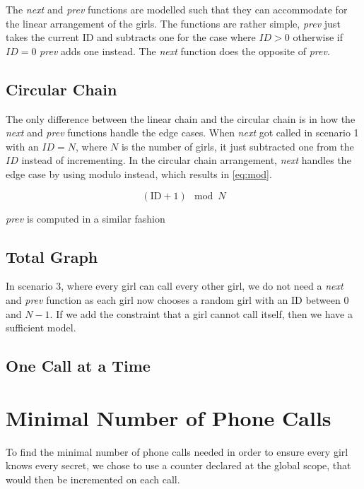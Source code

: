 \documentclass{article}
\begin{document}
The \textit{next} and \textit{prev} functions are modelled such that they can accommodate for the linear arrangement of the girls. The functions are rather simple, \textit{prev} just takes the current ID and subtracts one for the case where $ID > 0$ otherwise if $ID = 0$ \textit{prev} adds one instead. The \textit{next} function does the opposite of \textit{prev}.

\subsection*{Circular Chain}

The only difference between the linear chain and the circular chain is in how the \textit{next} and \textit{prev} functions handle the edge cases. When \textit{next} got called in scenario 1 with an $ID = N$, where $N$ is the number of girls, it just subtracted one from the $ID$ instead of incrementing. In the circular chain arrangement, \textit{next} handles the edge case by using modulo instead, which results in \autoref{eq:mod}.

\begin{equation}\label{eq:mod}
    (\text{ID} + 1) \mod N
\end{equation}

\textit{prev} is computed in a similar fashion

\subsection*{Total Graph}

In scenario 3, where every girl can call every other girl, we do not need a \textit{next} and \textit{prev} function as each girl now chooses a random girl with an ID between $0$ and $N-1$. If we add the constraint that a girl cannot call itself, then we have a sufficient model.

\subsection*{One Call at a Time}



\section*{Minimal Number of Phone Calls}\label{sec:prob:2}

To find the minimal number of phone calls needed in order to ensure every girl knows every secret, we chose to use a counter declared at the global scope, that would then be incremented on each call. 
\end{document}
